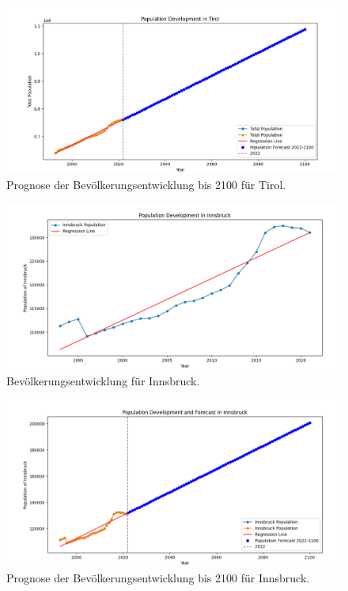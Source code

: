\documentclass[a4paper,12pt]{article}
\begin{document}
\begin{figure}[h]
    \centering
    \includegraphics[width=\textwidth]{image-1.png}
    \caption{Prognose der Bevölkerungsentwicklung bis 2100 für Tirol.}
    \label{fig:tirol-prognose}
\end{figure}

\begin{figure}[h]
    \centering
    \includegraphics[width=\textwidth]{image-2.png}
    \caption{Bevölkerungsentwicklung für Innsbruck.}
    \label{fig:innsbruck-entw}
\end{figure}

\begin{figure}[h]
    \centering
    \includegraphics[width=\textwidth]{image-3.png}
    \caption{Prognose der Bevölkerungsentwicklung bis 2100 für Innsbruck.}
    \label{fig:innsbruck-prognose}
\end{figure}
\end{document}
